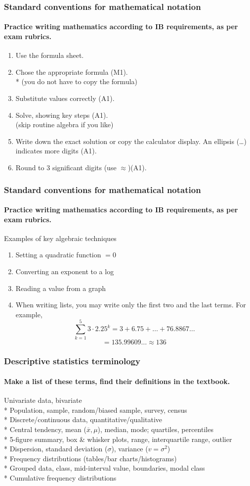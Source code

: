\documentclass{beamer}
\begin{document}
\frame
{
  \frametitle{Standard conventions for mathematical notation}
  \framesubtitle{Practice writing mathematics according to IB requirements, as per exam rubrics.}
\begin{enumerate}
    \item Use the formula sheet.
    \item Chose the appropriate formula (M1).\\*
    (you do not have to copy the formula)
    \item Substitute values correctly (A1). 
    \item Solve, showing key steps (A1).\\
    (skip routine algebra if you like)
    \item Write down the exact solution or copy the calculator display. An ellipsis (\ldots) indicates more digits (A1).
    \item Round to 3 significant digits (use $\approx$)(A1).
\end{enumerate}
}

\frame
{
  \frametitle{Standard conventions for mathematical notation}
  \framesubtitle{Practice writing mathematics according to IB requirements, as per exam rubrics.}
Examples of key algebraic techniques
\begin{enumerate}
    \item Setting a quadratic function $=0$
    \item Converting an exponent to a log
    \item Reading a value from a graph
    \item When writing lists, you may write only the first two and the last terms. For example,
\[\sum_{k=1}^5 3 \cdot 2.25^k =3 + 6.75+\ldots+76.8867\ldots\]
\[=135.99609\ldots \approx 136\]
\end{enumerate}
}


\frame
{
  \frametitle{Descriptive statistics terminology}
  \framesubtitle{Make a list of these terms, find their definitions in the textbook.}
  
  Univariate data, bivariate\\*
  Population, sample, random/biased sample, survey, census\\*
  Discrete/continuous data, quantitative/qualitative\\* 
  Central tendency, mean ($\overline{x}, \mu$), median, mode; quartiles, percentiles\\*
  5-figure summary, box \& whisker plots, range, interquartile range, outlier\\*
  Dispersion, standard deviation ($\sigma$), variance ($v=\sigma^2$)\\*
  Frequency distributions (tables/bar charts/histograms)\\*
  Grouped data, class, mid-interval value, boundaries, modal class\\*
  Cumulative frequency distributions

  
}
\end{document}
